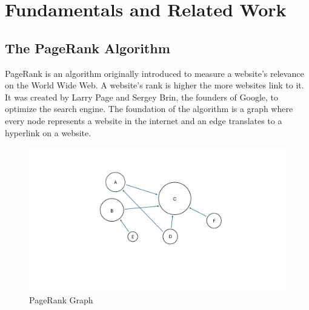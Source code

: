 
\section{Fundamentals and Related Work}
\subsection{The PageRank Algorithm}



PageRank is an algorithm originally introduced to measure a website's relevance on the World Wide Web. A website's rank is higher the more websites link to it. It was created by Larry Page and Sergey Brin, the founders of Google, to optimize the search engine.
The foundation of the algorithm is a graph where every node represents a website in the internet and an edge translates to a hyperlink on a website.
\begin{figure}[ht]
    \centering
    \includegraphics[width=0.7\linewidth]{images/PageRank Graph.pdf}
    \caption{PageRank Graph}
    \label{fig:pagerank-toy}
\end{figure}

